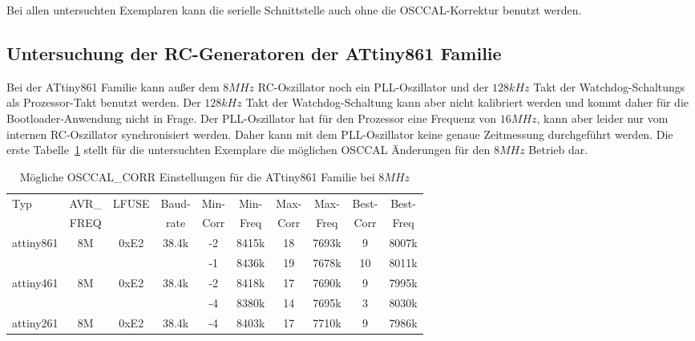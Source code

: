 Bei allen untersuchten Exemplaren kann die serielle Schnittstelle auch ohne die
OSCCAL-Korrektur benutzt werden.


\subsection{Untersuchung der RC-Generatoren der ATtiny861 Familie}

Bei der ATtiny861 Familie kann außer dem \(8MHz\) RC-Oszillator noch ein PLL-Oszillator
und der \(128kHz\) Takt der Watchdog-Schaltungs als Prozessor-Takt benutzt werden.
Der \(128kHz\) Takt der Watchdog-Schaltung kann aber nicht kalibriert werden und
kommt daher für die Bootloader-Anwendung nicht in Frage.
Der PLL-Oszillator hat für den Prozessor eine Frequenz von \(16MHz\), kann aber leider
nur vom internen RC-Oszillator synchronisiert werden. Daher kann mit dem PLL-Oszillator
keine genaue Zeitmessung durchgeführt werden.
Die erste Tabelle~\ref{tab:tiny861freq8} stellt für die untersuchten Exemplare die möglichen
OSCCAL Änderungen für den \(8MHz\) Betrieb dar.

\begin{table}[H]
  \begin{center}
    \begin{tabular}{| l | c | c | c || c | c || c | c || c | c |}
    \hline
   Typ  &       AVR\_ & LFUSE & Baud- & Min- & Min- & Max- & Max- & Best- & Best-  \\
        &       FREQ  &       & rate & Corr & Freq & Corr & Freq  & Corr  & Freq  \\
    \hline
    \hline
attiny861 &          8M & 0xE2  & 38.4k &  -2  & 8415k & 18  & 7693k  & 9  & 8007k \\
          &             &       &       &  -1  & 8436k & 19  & 7678k  & 10 & 8011k \\
    \hline
attiny461  &         8M & 0xE2  & 38.4k &  -2  & 8418k & 17 & 7690k  & 9  & 7995k \\
           &            &       &       &  -4  & 8380k & 14 & 7695k  & 3  & 8030k \\
    \hline
attiny261  &         8M & 0xE2  & 38.4k &  -4  & 8403k & 17 & 7710k  & 9  & 7986k \\
    \hline
    \end{tabular}
  \end{center}
  \caption{Mögliche OSCCAL\_CORR Einstellungen für die ATtiny861 Familie bei \(8MHz\)}
  \label{tab:tiny861freq8}
\end{table}

